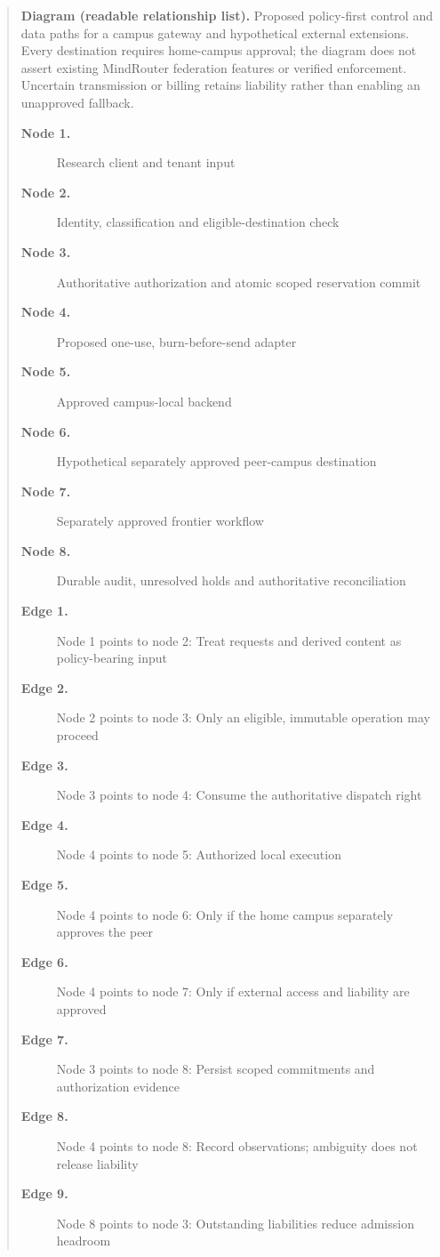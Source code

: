 \documentclass[11pt]{article}
\begin{document}
\begin{quote}
\textbf{Diagram (readable relationship list).} Proposed policy-first control and data paths for a campus gateway and hypothetical external extensions. Every destination requires home-campus approval; the diagram does not assert existing MindRouter federation features or verified enforcement. Uncertain transmission or billing retains liability rather than enabling an unapproved fallback.
\begin{description}
\item[\textbf{Node 1.}] Research client and tenant input
\item[\textbf{Node 2.}] Identity, classification and eligible-destination check
\item[\textbf{Node 3.}] Authoritative authorization and atomic scoped reservation commit
\item[\textbf{Node 4.}] Proposed one-use, burn-before-send adapter
\item[\textbf{Node 5.}] Approved campus-local backend
\item[\textbf{Node 6.}] Hypothetical separately approved peer-campus destination
\item[\textbf{Node 7.}] Separately approved frontier workflow
\item[\textbf{Node 8.}] Durable audit, unresolved holds and authoritative reconciliation
\item[\textbf{Edge 1.}] Node 1 points to node 2: Treat requests and derived content as policy-bearing input
\item[\textbf{Edge 2.}] Node 2 points to node 3: Only an eligible, immutable operation may proceed
\item[\textbf{Edge 3.}] Node 3 points to node 4: Consume the authoritative dispatch right
\item[\textbf{Edge 4.}] Node 4 points to node 5: Authorized local execution
\item[\textbf{Edge 5.}] Node 4 points to node 6: Only if the home campus separately approves the peer
\item[\textbf{Edge 6.}] Node 4 points to node 7: Only if external access and liability are approved
\item[\textbf{Edge 7.}] Node 3 points to node 8: Persist scoped commitments and authorization evidence
\item[\textbf{Edge 8.}] Node 4 points to node 8: Record observations; ambiguity does not release liability
\item[\textbf{Edge 9.}] Node 8 points to node 3: Outstanding liabilities reduce admission headroom

\end{description}
\end{quote}
\end{document}
